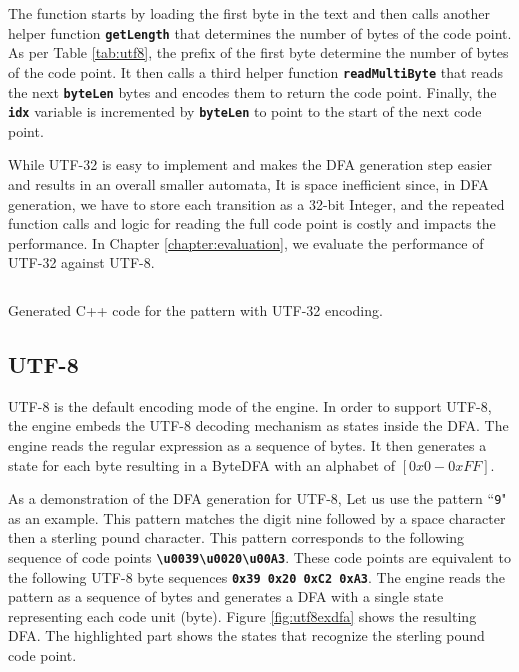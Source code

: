 The function starts by loading the first byte in the text and then calls another helper function \texttt{\textbf{getLength}} that determines the number of bytes of the code point. As per Table \ref{tab:utf8}, the prefix of the first byte determine the number of bytes of the code point. It then calls a third helper function \texttt{\textbf{readMultiByte}} that reads the next \texttt{\textbf{byteLen}} bytes and encodes them to return the code point. Finally, the \texttt{\textbf{idx}} variable is incremented by \texttt{\textbf{byteLen}} to point to the start of the next code point.

While UTF-32 is easy to implement and makes the DFA generation step easier and results in an overall smaller automata, It is space inefficient since, in DFA generation, we have to store each transition as a 32-bit Integer, and the repeated function calls and logic for reading the full code point is costly and impacts the performance. In Chapter \ref{chapter:evaluation}, we evaluate the performance of UTF-32 against UTF-8.

\begin{listing}[H]
\inputminted[breaklines=true,frame=lines,linenos,fontsize=\small]{cpp}{code/utf32.cpp}
\caption{Generated C++ code for the pattern \texttt{\textbf{\textsterling}} with UTF-32 encoding.}
\label{lst:utf32nextbyte}
\end{listing}

\subsection{UTF-8}
UTF-8 is the default encoding mode of the engine. In order to support UTF-8, the engine embeds the UTF-8 decoding mechanism as states inside the DFA. The engine reads the regular expression as a sequence of bytes. It then generates a state for each byte resulting in a ByteDFA with an alphabet of $[0x0 - 0xFF]$.

As a demonstration of the DFA generation for UTF-8, Let us use the pattern ``\texttt{9\textvisiblespace \textsterling}" as an example. This pattern matches the digit nine followed by a space character then a sterling pound character. This pattern corresponds to the following sequence of code points \texttt{\textbf{\textbackslash u0039\textbackslash u0020\textbackslash u00A3}}. These code points are equivalent to the following UTF-8 byte sequences \texttt{\textbf{0x39 0x20 0xC2 0xA3}}. The engine reads the pattern as a sequence of bytes and generates a DFA with a single state representing each code unit (byte). Figure \ref{fig:utf8exdfa} shows the resulting DFA. The highlighted part shows the states that recognize the sterling pound code point.

